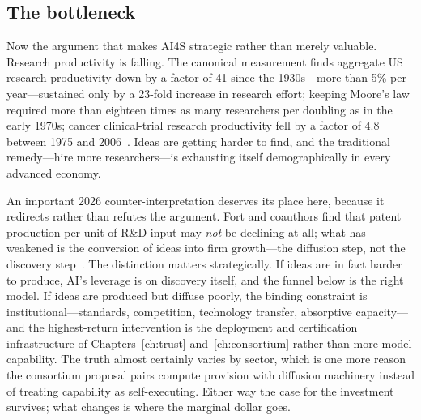 \subsection{The bottleneck}

Now the argument that makes AI4S strategic rather than merely valuable. Research productivity is falling. The canonical measurement finds aggregate US research productivity down by a factor of 41 since the 1930s---more than 5\% per year---sustained only by a 23-fold increase in research effort; keeping Moore's law required more than eighteen times as many researchers per doubling as in the early 1970s; cancer clinical-trial research productivity fell by a factor of 4.8 between 1975 and 2006~\cite{ideas-harder}. Ideas are getting harder to find, and the traditional remedy---hire more researchers---is exhausting itself demographically in every advanced economy.

An important 2026 counter-interpretation deserves its place here, because it redirects rather than refutes the argument. Fort and coauthors find that patent production per unit of R\&D input may \emph{not} be declining at all; what has weakened is the conversion of ideas into firm growth---the diffusion step, not the discovery step~\cite{fort2026}. The distinction matters strategically. If ideas are in fact harder to produce, AI's leverage is on discovery itself, and the funnel below is the right model. If ideas are produced but diffuse poorly, the binding constraint is institutional---standards, competition, technology transfer, absorptive capacity---and the highest-return intervention is the deployment and certification infrastructure of Chapters~\ref{ch:trust} and~\ref{ch:consortium} rather than more model capability. The truth almost certainly varies by sector, which is one more reason the consortium proposal pairs compute provision with diffusion machinery instead of treating capability as self-executing. Either way the case for the investment survives; what changes is where the marginal dollar goes.

